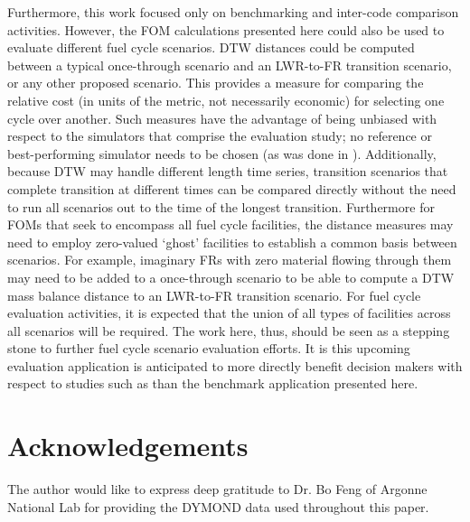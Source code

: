 \documentclass{ntmanuscript}
\begin{document}
Furthermore, this work focused only on benchmarking and inter-code comparison
activities.
However, the FOM calculations presented here could also be used to evaluate
different fuel cycle scenarios. DTW distances could be computed between
a typical once-through scenario and an LWR-to-FR transition
scenario, or any other proposed scenario. This provides a measure for
comparing the relative cost (in units of the metric, not necessarily
economic) for selecting one cycle over another.
Such measures have the advantage of being unbiased with respect to the
simulators that comprise the evaluation study; no reference or best-performing
simulator needs to be chosen (as was done in \cite{wigeland2014nuclear}).
Additionally, because DTW may handle different length time series,
transition scenarios that complete transition at different times can be
compared directly without the need to run all scenarios out to the time of
the longest transition.
Furthermore for FOMs that seek to encompass all fuel cycle facilities,
the distance measures may need to employ zero-valued `ghost'
facilities to establish a common basis between scenarios.  For example,
imaginary FRs with zero material flowing through them may need to be added
to a once-through scenario to be able to compute a DTW mass balance distance
to an LWR-to-FR transition scenario. For fuel cycle evaluation activities,
it is expected that the union of all types of facilities across all scenarios
will be required.
The work here, thus,
should be seen as a stepping stone to further fuel cycle scenario evaluation
efforts. It is this upcoming evaluation application is anticipated to more
directly benefit decision makers with respect to studies such as
\cite{wigeland2014nuclear} than the benchmark application presented here.

\section*{Acknowledgements}
\label{acknow}
The author would like to express deep gratitude to Dr. Bo Feng of
Argonne National Lab for providing the DYMOND data used throughout this
paper.
\end{document}
